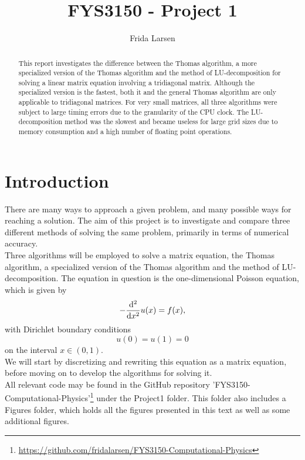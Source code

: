 \documentclass[notitlepage, reprint, nofootinbib]{revtex4-1}
\begin{document}
\title{FYS3150 - Project 1}
\author{Frida Larsen}

\begin{abstract}
This report investigates the difference between the Thomas algorithm, a more specialized version of the Thomas algorithm and the method of LU-decomposition for solving a linear matrix equation involving a tridiagonal matrix. Although the specialized version is the fastest, both it and the general Thomas algorithm are only applicable to tridiagonal matrices. For very small matrices, all three algorithms were subject to large timing errors due to the granularity of the CPU clock. The LU-decomposition method was the slowest and became useless for large grid sizes due to memory consumption and a high number of floating point operations. 
\end{abstract}

\maketitle

\section{Introduction}
There are many ways to approach a given problem, and many possible ways for reaching a solution. The aim of this project is to investigate and compare three different methods of solving the same problem, primarily in terms of numerical accuracy.\\[2mm]
Three algorithms will be employed to solve a matrix equation, the Thomas algorithm, a specialized version of the Thomas algorithm and the method of LU-decomposition. The equation in question is the one-dimensional Poisson equation, which is given by 
\begin{equation}\label{Poisson}-\dv[2]{x} u(x)=f(x),\end{equation}
with Dirichlet boundary conditions
\begin{equation}\label{Dirichlet}u(0)=u(1)=0\end{equation}
on the interval $x\in (0,1)$. \\[2mm]
We will start by discretizing and rewriting this equation as a matrix equation, before moving on to develop the algorithms for solving it.\\[2mm]
All relevant code may be found in the GitHub repository 'FYS3150-Computational-Physics'\footnote{\href{GitHub Repository}{https://github.com/fridalarsen/FYS3150-Computational-Physics}} under the Project1 folder. This folder also includes a Figures folder, which holds all the figures presented in this text as well as some additional figures.
\end{document}
